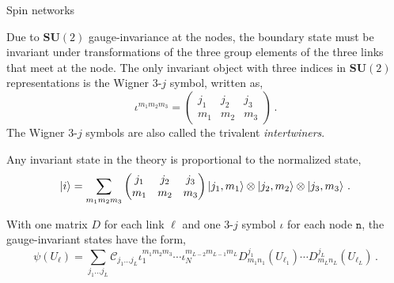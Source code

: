 \documentclass{beamer}
\newcommand\italictext[1]{\textcolor{italics}{\textit{#1}}}
\begin{document}
\begin{frame}{Spin networks}
    \begin{list}{\maltese}{\leftmargin=1em \itemindent=0em}
        \item<1-> Due to $\mathbf{SU}(2)$ gauge-invariance at the nodes, the boundary state must be invariant under transformations of the three group elements of the three links that meet at the node. The only invariant object with three indices in $\mathbf{SU}(2)$ representations is the Wigner 3-$j$ symbol, written as,
        \begin{equation}
            \iota^{m_1m_2m_3}=
            \begin{pmatrix}
                j_1 & j_2 & j_3 \\
                m_1 & m_2 & m_3
            \end{pmatrix}\,.
        \end{equation}
        The Wigner 3-$j$ symbols are also called the trivalent \italictext{intertwiners}.
        \item<2-> Any invariant state in the theory is proportional to the normalized state,
        \begin{equation}
            \ket{i}=\sum_{m_1m_2m_3}
            \begin{pmatrix}
                j_1 & j_2 & j_3 \\
                m_1 & m_2 & m_3
            \end{pmatrix}
            \ket{j_1,m_1}\otimes\ket{j_2,m_2}\otimes\ket{j_3,m_3}\,.
        \end{equation}
        \item<3-> With one matrix $D$ for each link $\ell$ and one 3-$j$ symbol $\iota$ for each node $\mathtt{n}$, the gauge-invariant states have the form,
        \begin{equation*}
            \psi(U_\ell)=\sum_{j_1\dots j_L}\mathcal{C}_{j_1\dots j_L}\iota^{m_1m_2m_3}_1\cdots\iota^{m_{L-2}m_{L-1}m_L}_N D^{j_1}_{m_1n_1}(U_{\ell_1})\cdots D^{j_L}_{m_Ln_L}(U_{\ell_L})\,.
        \end{equation*} 
    \end{list}
\end{frame}
\end{document}

